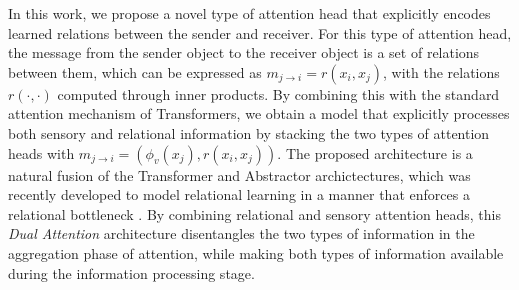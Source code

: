 In this work, we propose a novel type of attention head that explicitly encodes learned  relations between the sender and receiver. For this type of attention head, the message from the sender object to the receiver object is a set of relations between them, which can be expressed as $m_{j \to i} = r(x_i, x_j)$, with the relations $r(\cdot,\cdot)$ computed through inner products. By combining this with the standard attention mechanism of Transformers, we obtain a model that explicitly processes both sensory and relational information by stacking the two types of attention heads with $m_{j \to i} = (\phi_v(x_j), r(x_i, x_j))$. The proposed architecture is a natural fusion of the Transformer and Abstractor archictectures, which was recently developed to model relational 
learning in a manner that enforces a relational bottleneck 
\citep{altabaaAbstractorsRelationalCrossattention2023a,webbRelationalBottleneckInductive2024}. By combining relational and sensory attention 
heads, this \textit{Dual Attention} architecture disentangles the two types of information in the aggregation phase of attention, while making both types of information available during the information processing stage. 


